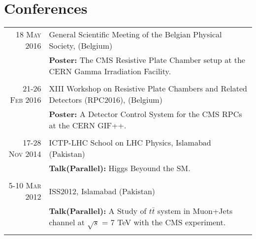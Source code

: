 \documentclass[a4paper,10pt]{article}
\begin{document}
\section{Conferences}
\begin{tabular}{rp{11.3cm}}
\textsc{18 May 2016} & General Scientific Meeting of the Belgian Physical Society, (Belgium) \\& \textbf{Poster:} The CMS Resistive Plate Chamber setup at the CERN Gamma Irradiation Facility.\\\multicolumn{2}{c}{} \\
\textsc{21-26 Feb 2016} & XIII Workshop on Resistive Plate Chambers and Related Detectors (RPC2016), (Belgium) \\& \textbf{Poster:} A Detector Control System for the CMS RPCs at the CERN GIF++.\\\multicolumn{2}{c}{} \\
\textsc{17-28 Nov 2014} & ICTP-LHC School on LHC Physics, Islamabad (Pakistan) \\& \textbf{Talk(Parallel):} Higgs Beyound the SM.\\\multicolumn{2}{c}{} \\
\textsc{5-10 Mar 2012} & ISS2012, Islamabad (Pakistan) \\& \textbf{Talk(Parallel):} A Study of $t\bar{t}$ system in Muon+Jets channel at $\sqrt{s}$ = 7 TeV with the CMS experiment. \\\multicolumn{2}{c}{} \\
\end{tabular}

\end{document}
